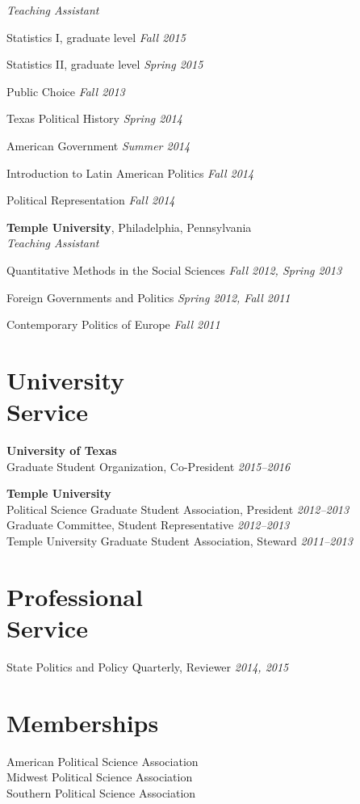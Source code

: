 \documentclass[margin,line]{res}
\newenvironment{list2}{
    \begin{list}{--}{%
        \setlength{\itemsep}{0in}
        \setlength{\parsep}{0in} \setlength{\parskip}{0in}
        \setlength{\topsep}{0in} \setlength{\partopsep}{0in}
        \setlength{\leftmargin}{0.2in}}}{\end{list}}
\begin{document}
\begin{resume}
\emph{Teaching Assistant} 
\begin{list2}
\item Statistics I, graduate level \hfill \emph{Fall 2015}
\item Statistics II, graduate level \hfill \emph{Spring 2015}
\item Public Choice \hfill \emph{Fall 2013}
\item Texas Political History \hfill \emph{Spring 2014}
\item American Government \hfill \emph{Summer 2014}
\item Introduction to Latin American Politics \hfill \emph{Fall 2014}
\item Political Representation \hfill \emph{Fall 2014}
\end{list2}

\textbf{Temple University}, Philadelphia, Pennsylvania  \\
\emph{Teaching Assistant}

\begin{list2}
\item Quantitative Methods in the Social Sciences \hfill \emph{Fall 2012, Spring 2013}
\item Foreign Governments and Politics \hfill \emph{Spring 2012, Fall 2011}
\item Contemporary Politics of Europe \hfill \emph{Fall 2011}
\end{list2}

\section{\sc University \\Service}
\textbf{University of Texas} \\
Graduate Student Organization, Co-President \hfill \emph{2015--2016} %

\textbf{Temple University}\\
Political Science Graduate Student Association, President \hfill \emph{2012--2013} \\
Graduate Committee, Student Representative \hfill \emph{2012--2013} \\
Temple University Graduate Student Association, Steward \hfill \emph{2011--2013} %

\section{\sc Professional \\Service}
State Politics and Policy Quarterly, Reviewer \hfill \emph{2014, 2015} \\

\section{\sc Memberships}
American Political Science Association \\
Midwest Political Science Association \\
Southern Political Science Association \\


\end{resume}
\end{document}

